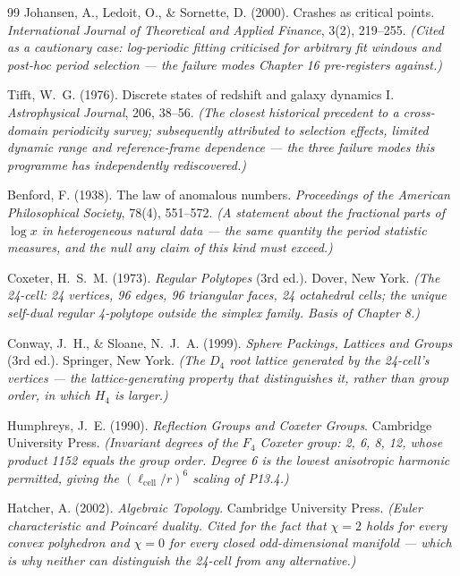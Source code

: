 \documentclass[11pt, letterpaper, openany]{book}
\begin{document}
\begin{thebibliography}{99}
Johansen, A., Ledoit, O., \& Sornette, D. (2000).
Crashes as critical points.
\textit{International Journal of Theoretical and Applied Finance}, 3(2), 219--255.
\textit{(Cited as a cautionary case: log-periodic fitting criticised for arbitrary fit windows
and post-hoc period selection --- the failure modes Chapter 16 pre-registers against.)}

Tifft, W.~G. (1976).
Discrete states of redshift and galaxy dynamics I.
\textit{Astrophysical Journal}, 206, 38--56.
\textit{(The closest historical precedent to a cross-domain periodicity survey; subsequently
attributed to selection effects, limited dynamic range and reference-frame dependence --- the
three failure modes this programme has independently rediscovered.)}

Benford, F. (1938).
The law of anomalous numbers.
\textit{Proceedings of the American Philosophical Society}, 78(4), 551--572.
\textit{(A statement about the fractional parts of $\log x$ in heterogeneous natural data ---
the same quantity the period statistic measures, and the null any claim of this kind must
exceed.)}


Coxeter, H.~S.~M. (1973).
\textit{Regular Polytopes} (3rd ed.). Dover, New York.
\textit{(The 24-cell: 24 vertices, 96 edges, 96 triangular faces, 24 octahedral cells; the
unique self-dual regular 4-polytope outside the simplex family. Basis of Chapter 8.)}

Conway, J.~H., \& Sloane, N.~J.~A. (1999).
\textit{Sphere Packings, Lattices and Groups} (3rd ed.). Springer, New York.
\textit{(The $D_4$ root lattice generated by the 24-cell's vertices --- the lattice-generating
property that distinguishes it, rather than group order, in which $H_4$ is larger.)}

Humphreys, J.~E. (1990).
\textit{Reflection Groups and Coxeter Groups}. Cambridge University Press.
\textit{(Invariant degrees of the $F_4$ Coxeter group: 2, 6, 8, 12, whose product 1152 equals
the group order. Degree 6 is the lowest anisotropic harmonic permitted, giving the
$(\ell_{\mathrm{cell}}/r)^6$ scaling of P13.4.)}

Hatcher, A. (2002).
\textit{Algebraic Topology}. Cambridge University Press.
\textit{(Euler characteristic and Poincar\'e duality. Cited for the fact that $\chi = 2$ holds
for every convex polyhedron and $\chi = 0$ for every closed odd-dimensional manifold --- which
is why neither can distinguish the 24-cell from any alternative.)}


\end{thebibliography}
\end{document}
